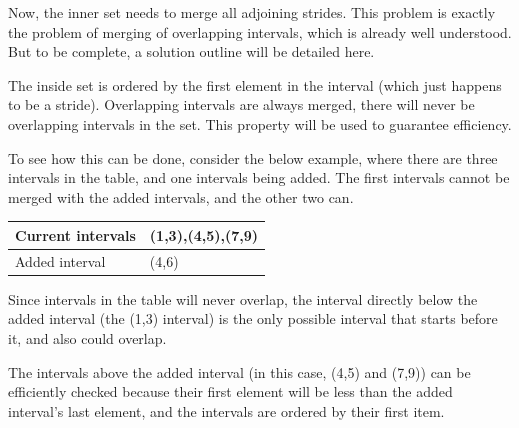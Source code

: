 \documentclass[12pt,twoside]{reedthesis}
\begin{document}
			Now, the inner set needs to merge all adjoining strides. This problem is exactly the problem of merging of overlapping intervals, which is already well understood. But to be complete, a solution outline will be detailed here. %
			
			The inside set is ordered by the first element in the interval (which just happens to be a stride). Overlapping intervals are always merged, there will never be overlapping intervals in the set. This property will be used to guarantee efficiency.
			
			To see how this can be done, consider the below example, where there are three intervals in the table, and one intervals being added. The first intervals cannot be merged with the added intervals, and the other two can. 
			
			\newcommand{\bcl}{\cellcolor{black!50}}
			\begin{tabular}{ |l|l| } 
				\hline
				Current intervals & (1,3),(4,5),(7,9) \\ 
				\hline
				Added interval & (4,6) \\ 
				\hline
			\end{tabular}
			
			Since intervals in the table will never overlap, the interval directly below the added interval (the (1,3) interval) is the only possible interval that starts before it, and also could overlap.%
			
			The intervals above the added interval (in this case, (4,5) and (7,9)) can be efficiently checked because their first element will be less than the added interval's last element, and the intervals are ordered by their first item. %
			
			
			
\end{document}
